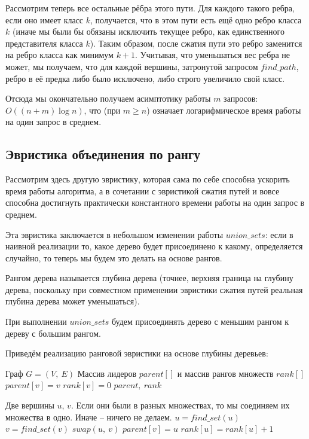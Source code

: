 \documentclass[a4paper,12pt]{article}
\begin{document}
Рассмотрим теперь все остальные рёбра этого пути. Для каждого такого ребра, если оно имеет класс $k$, получается, что в этом пути есть ещё одно ребро класса $k$ (иначе мы были бы обязаны исключить текущее ребро, как единственного представителя класса $k$). Таким образом, после сжатия пути это ребро заменится на ребро класса как минимум $k+1$. Учитывая, что уменьшаться вес ребра не может, мы получаем, что для каждой вершины, затронутой запросом $find\_path$, ребро в её предка либо было исключено, либо строго увеличило свой класс.

Отсюда мы окончательно получаем асимптотику работы $m$ запросов: $O((n+m) \log n)$, что (при $m \ge n$) означает логарифмическое время работы на один запрос в среднем.

\subsection{Эвристика объединения по рангу}

Рассмотрим здесь другую эвристику, которая сама по себе способна ускорить время работы алгоритма, а в сочетании с эвристикой сжатия путей и вовсе способна достигнуть практически константного времени работы на один запрос в среднем.

Эта эвристика заключается в небольшом изменении работы $union\_sets$: если в наивной реализации то, какое дерево будет присоединено к какому, определяется случайно, то теперь мы будем это делать на основе рангов.

Рангом дерева называется  глубина дерева (точнее, верхняя граница на глубину дерева, поскольку при совместном применении эвристики сжатия путей реальная глубина дерева может уменьшаться).

При выполнении $union\_sets$ будем присоединять дерево с меньшим рангом к дереву с большим рангом.

Приведём реализацию ранговой эвристики на основе глубины деревьев:

\begin{algorithm}
  	\caption{($(V,\ E)$)}
	\begin{algorithmic}
	    \Require Граф $G = (V,\ E)$
	    \Ensure Массив лидеров $parent[]$ и массив рангов множеств $rank[]$
	    \State
	        \State $parent[v] = v$
	        \State $rank[v] = 0$
	   \EndFor
	   \Return $parent,\ rank$
	\end{algorithmic}
\end{algorithm}

\begin{algorithm}
  	\caption{($u,\ v$)}
	\begin{algorithmic}
	    \Require Две вершины $u$, $v$.
	    \Ensure Если они были в разных множествах, то мы соединяем их множества в одно. Иначе -- ничего не делаем.
	    \State
	    \State $u = find\_set(u)$
	    \State $v = find\_set(v)$
	    \If{$u \neq v$}
	        \If{$rank[u] < rank[v]$}
	            \State $swap(u,\ v)$
	        \EndIf
	        \State $parent[v] = u$
	        \If{$rank[u] == rank[v]$}
	            \State $rank[u] = rank[u] + 1$
	        \EndIf
	   \EndIf
	\end{algorithmic}
\end{algorithm}
\end{document}
